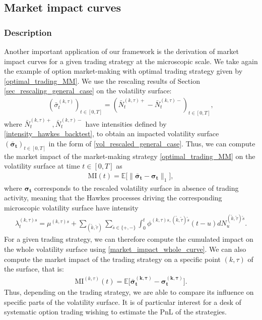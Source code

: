 \documentclass[12pt]{article}
\begin{document}
\subsection{Market impact curves}

\subsubsection{Description}

Another important application of our framework is the derivation of market impact curves for a given trading strategy at the microscopic scale. We take again the example of option market-making with optimal trading strategy given by \eqref{optimal_trading_MM}. We use the rescaling results of Section \eqref{sec_rescaling_general_case} on the volatility surface:
\begin{align*}
(\bar{\sigma}_t^{(k,\tau)})_{t\in [0,T]} = (\bar{N}_t^{(k,\tau)+}-\bar{N}_t^{(k,\tau)-})_{t\in [0,T]}, 
\end{align*}
where $\bar{N}_t^{(k,\tau)+},\bar{N}_t^{(k,\tau)-}$ have intensities defined by \eqref{intensity_hawkes_backtest}, to obtain an impacted volatility surface $(\boldsymbol{\bar{\sigma}_t})_{t\in[0,T]}$ in the form of \eqref{vol_rescaled_general_case}. Thus, we can compute the market impact of the market-making strategy \eqref{optimal_trading_MM} on the volatility surface at time $t\in[0,T]$ as 
\begin{align}\label{market_impact_whole_curve}
    \text{MI}(t) = \mathbb{E}\big[\|\boldsymbol{\bar{\sigma}_t} - \boldsymbol{\sigma_t}\|_1\big],
\end{align}
where $\boldsymbol{\sigma_t}$ corresponds to the rescaled volatility surface in absence of trading activity, meaning that the Hawkes processes driving the corresponding microscopic volatility surface have intensity 
\begin{align*}
    \lambda_t^{(k,\tau)s} = \mu^{(k,\tau)s} + \sum_{(\tilde k,\tilde \tau)}\sum_{\tilde{s}\in \{+,-\}}\int_0^t \phi^{(k,\tau)s,(\tilde k,\tilde \tau)\tilde{s}}(t-u)dN^{(\tilde k,\tilde \tau)\tilde{s}}_u. 
\end{align*}
For a given trading strategy, we can therefore compute the cumulated impact on the whole volatility surface using \eqref{market_impact_whole_curve}. We can also compute the market impact of the trading strategy on a specific point $(k,\tau)$ of the surface, that is:
\begin{align*}%
    \text{MI}^{(k,\tau)}(t) = \mathbb{E}\big[\boldsymbol{\bar{\sigma}^{(k,\tau)}_t} - \boldsymbol{\sigma^{(k,\tau)}_t}\big]. 
\end{align*}
Thus, depending on the trading strategy, we are able to compare its influence on specific parts of the volatility surface. It is of particular interest for a desk of systematic option trading wishing to estimate the PnL of the strategies. 
\end{document}
